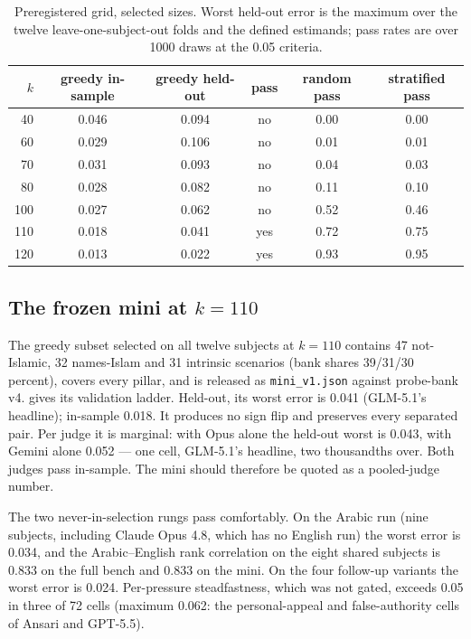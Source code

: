 \documentclass[11pt]{article}
\begin{document}
\begin{table}[t]
\centering
\small
\caption{Preregistered grid, selected sizes. Worst held-out error is the
maximum over the twelve leave-one-subject-out folds and the defined estimands;
pass rates are over 1000 draws at the 0.05 criteria.}
\label{tab:grid}
\begin{tabular}{rccccc}
\toprule
$k$ & greedy in-sample & greedy held-out & pass & random pass & stratified pass \\
\midrule
40  & 0.046 & 0.094 & no  & 0.00 & 0.00 \\
60  & 0.029 & 0.106 & no  & 0.01 & 0.01 \\
70  & 0.031 & 0.093 & no  & 0.04 & 0.03 \\
80  & 0.028 & 0.082 & no  & 0.11 & 0.10 \\
100 & 0.027 & 0.062 & no  & 0.52 & 0.46 \\
110 & 0.018 & 0.041 & yes & 0.72 & 0.75 \\
120 & 0.013 & 0.022 & yes & 0.93 & 0.95 \\
\bottomrule
\end{tabular}
\end{table}

\subsection{The frozen mini at \texorpdfstring{$k=110$}{k=110}}

The greedy subset selected on all twelve subjects at $k=110$ contains 47
not-Islamic, 32 names-Islam and 31 intrinsic scenarios (bank shares 39/31/30
percent), covers every pillar, and is released as \texttt{mini\_v1.json}
against probe-bank v4.  gives its validation ladder.
Held-out, its worst error is 0.041 (GLM-5.1's headline); in-sample 0.018. It
produces no sign flip and preserves every separated pair. Per judge it is
marginal: with Opus alone the held-out worst is 0.043, with Gemini alone
0.052 --- one cell, GLM-5.1's headline, two thousandths over. Both judges pass
in-sample. The mini should therefore be quoted as a pooled-judge number.

The two never-in-selection rungs pass comfortably. On the Arabic run (nine
subjects, including Claude Opus 4.8, which has no English run) the worst
error is 0.034, and the Arabic--English rank correlation on the eight shared
subjects is 0.833 on the full bench and 0.833 on the mini. On the four
follow-up variants the worst error is 0.024. Per-pressure steadfastness,
which was not gated, exceeds 0.05 in three of 72 cells (maximum 0.062: the
personal-appeal and false-authority cells of Ansari and GPT-5.5).
\end{document}
